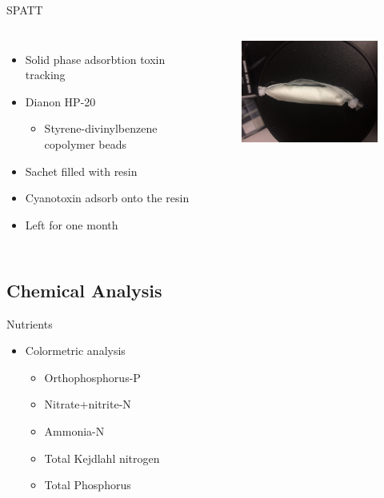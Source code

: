 \begin{frame}{SPATT}

\begin{columns}
	\begin{itemize}
		\item Solid phase adsorbtion toxin tracking 
		\item Dianon HP-20 
		\begin{itemize}
			\item Styrene-divinylbenzene copolymer beads
		\end{itemize} 
		
		\item Sachet filled with resin
		\item Cyanotoxin adsorb onto the resin
		\item Left for one month
	\end{itemize}

	\begin{figure}
		\includegraphics[width=2.3in,angle=-90]{bag.jpg}
	\end{figure}

\end{columns}

\end{frame}


\subsection{Chemical Analysis}

\begin{frame}{Nutrients}
	\begin{itemize}
\item Colormetric analysis
\begin{itemize}
		\item Orthophosphorus-P 
		\item Nitrate+nitrite-N 
		\item Ammonia-N 
		\item Total Kejdlahl nitrogen 
		\item Total Phosphorus
	\end{itemize}
\end{itemize}
	

\end{frame}

